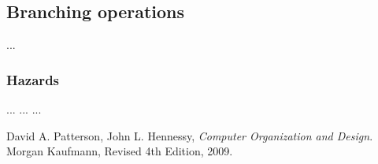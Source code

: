 \documentclass[11pt,twoside,a4paper]{article}
\begin{document}
\subsection{Branching operations}
...

\subsubsection{Hazards}
\begin{multicols}{2}
\noindent ...
\vfill
\columnbreak
...
\lstset{language=[mips]Assembler}
% 
...
\end{multicols}

\newpage
\pagestyle{fancy}
\begin{thebibliography}{9}

  David A. Patterson, John L. Hennessy,
  \emph{Computer Organization and Design}.
  Morgan Kaufmann,
  Revised 4th Edition,
  2009.

\end{thebibliography}
\end{document}
